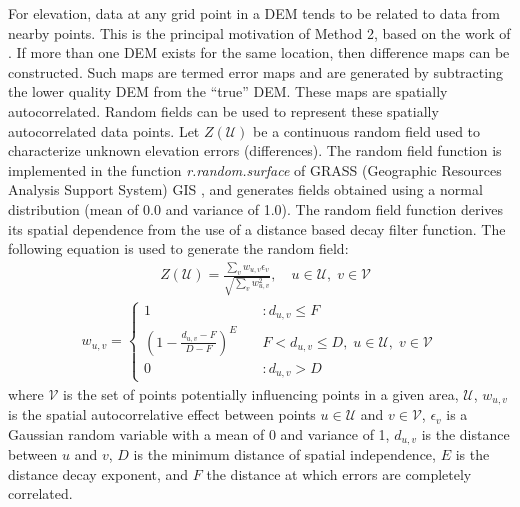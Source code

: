 \documentclass[12pt]{article}
\begin{document}
For elevation, data at any grid point in a DEM tends to be related to
data from nearby points.  This is the principal motivation of Method
2, based on the work of \citep{Ehlschlaeger_1994}. If more than one
DEM exists for the same location, then difference maps can be
constructed. Such maps are termed error maps
and are generated by subtracting the lower quality DEM from the ``true'' DEM.
These maps are spatially autocorrelated.  Random fields can be used to 
represent these spatially autocorrelated data points.  Let $Z(\mathcal{U})$ be a
continuous random field used to characterize unknown elevation errors
(differences).
The random field function is implemented in the function
\textit{r.random.surface} \citep{Ehlschlaeger_1994} of GRASS (Geographic Resources Analysis Support System) GIS
\citep{Mitasova1996}, and generates fields obtained using a normal
distribution (mean of 0.0 and variance of 1.0). The random field
function derives its spatial dependence from the use of a distance
based decay filter function. The following equation is used to
generate the random field:
\begin{align}
  &Z(\mathcal{U})= \frac{\sum_v w_{u,v}\epsilon_v}{\sqrt{\sum_v
      w_{u,v}^2}}, \quad u\in \mathcal{U}, \; v \in \mathcal{V}
 \label{eqn1}
 \end{align}
 \begin{align}
   w_{u,v} = \left\{ \begin{array}{ll} 1 & \quad :d_{u,v} \le F \\
       \left(1- \frac{d_{u,v} - F}{D - F} \right)^E & \quad F <
       d_{u,v} \le D, \; u \in \mathcal{U}, \; v \in \mathcal{V}\\ 0 &
       \quad :d_{u,v} > D
\end{array} \right.
\label{eqn2}                                                    
\end{align}
where $\mathcal{V}$ is the set of points potentially influencing
points in a given area, $\mathcal{U}$, $w_{u,v}$ is the spatial
autocorrelative effect between points $u \in \mathcal{U}$ and $v \in
\mathcal{V}$, $\epsilon_v$ is a Gaussian random variable with a mean of 0 and
variance of 1, $d_{u,v}$ is the distance between $u$ and $v$, $D$ is
the minimum distance of spatial independence, $E$ is the distance
decay exponent, and $F$ the distance at which errors are completely
correlated.
\end{document}
